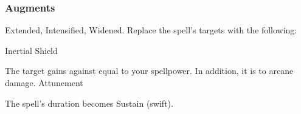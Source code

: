 \subsubsection{Augments}
 Extended, Intensified, Widened.
Replace
the spell's targets with the following:
\begin{augmenttargetinginfo}
\end{augmenttargetinginfo}
\begin{spellsection}{Inertial Shield}
\begin{spellheader}
\end{spellheader}
\begin{spellcontent}
\begin{spelltargetinginfo}
\end{spelltargetinginfo}
\begin{spelleffects}
\spelleffect
The target gains  against  equal to your spellpower.
In addition, it is  to arcane damage.
\spelldur Attunement
\end{spelleffects}
\end{spellcontent}
\begin{spellfooter}
\miscastexplode
\end{spellfooter}
\begin{spellcantrip}
The spell's duration becomes Sustain (swift).
\end{spellcantrip}
\end{spellsection}
